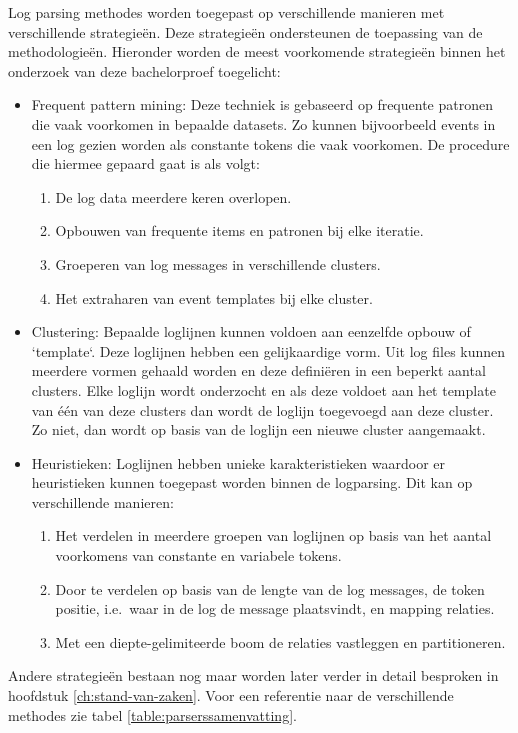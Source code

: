 Log parsing methodes worden toegepast op verschillende manieren met verschillende strategieën. Deze strategieën ondersteunen de toepassing van de methodologieën. Hieronder worden de meest voorkomende strategieën binnen het onderzoek van deze bachelorproef toegelicht:
\begin{itemize}
    \item Frequent pattern mining: Deze techniek is gebaseerd op frequente patronen die vaak voorkomen in bepaalde datasets.
    Zo kunnen bijvoorbeeld events in een log gezien worden als constante tokens die vaak voorkomen. De procedure die hiermee gepaard gaat is als volgt:
    \begin{enumerate}
        \item De log data meerdere keren overlopen.
        \item Opbouwen van frequente items en patronen bij elke iteratie.
        \item Groeperen van log messages in verschillende clusters.
        \item Het extraharen van event templates bij elke cluster. 
    \end{enumerate}

    \item Clustering: Bepaalde loglijnen kunnen voldoen aan eenzelfde opbouw of `template`. Deze loglijnen hebben een gelijkaardige vorm. Uit log files kunnen meerdere vormen gehaald worden en deze definiëren in een beperkt aantal clusters. Elke loglijn wordt onderzocht en als deze voldoet aan het template van één van deze clusters dan wordt de loglijn toegevoegd aan deze cluster. Zo niet, dan wordt op basis van de loglijn een nieuwe cluster aangemaakt.\\
    
    \item Heuristieken: Loglijnen hebben unieke karakteristieken waardoor er heuristieken kunnen toegepast worden binnen de logparsing. Dit kan op verschillende manieren:
    \begin{enumerate}
        \item Het verdelen in meerdere groepen van loglijnen op basis van het aantal voorkomens van constante en variabele tokens.
        \item Door te verdelen op basis van de lengte van de log messages, de token positie, i.e.\ waar in de log de message plaatsvindt, en mapping relaties.
        \item Met een diepte-gelimiteerde boom de relaties vastleggen en partitioneren.
    \end{enumerate}

\end{itemize}
Andere strategieën bestaan nog maar worden later verder in detail besproken in hoofdstuk \ref{ch:stand-van-zaken}. Voor een referentie naar de verschillende methodes zie tabel \ref{table:parserssamenvatting}.

